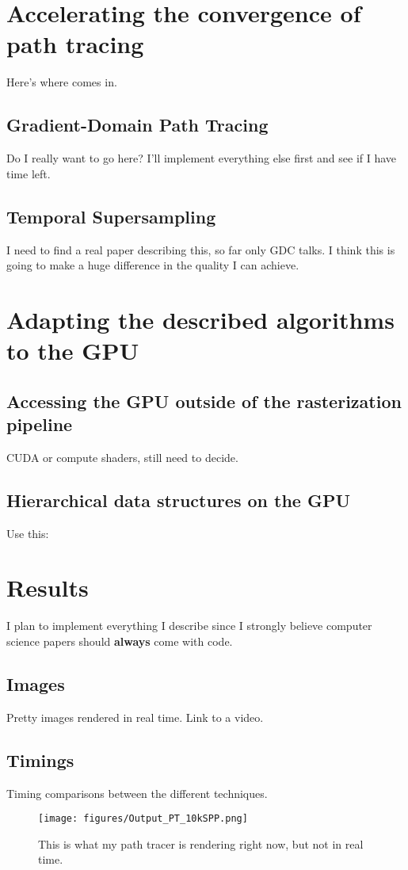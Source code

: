 \documentclass{ACGSeminar}
\begin{document}
\section{Accelerating the convergence of path tracing}
Here's where \cite{Pharr:2010:PBR:1854996} comes in.
\subsection{Gradient-Domain Path Tracing}
Do I really want to go here? \cite{Kettunen2015sg} I'll implement everything else first and see if I have time left.
\subsection{Temporal Supersampling}
I need to find a real paper describing this, so far only GDC talks. I think this is going to make a huge difference in the quality I can achieve.

\section{Adapting the described algorithms to the GPU}
\subsection{Accessing the GPU outside of the rasterization pipeline}
CUDA or compute shaders, still need to decide.
\subsection{Hierarchical data structures on the GPU}
Use this: \cite{Karras:2012:MPC:2383795.2383801}

\section{Results}
I plan to implement everything I describe since I strongly believe computer science papers should \textbf{always} come with code.
\subsection{Images}
Pretty images rendered in real time. Link to a video.
\subsection{Timings}
Timing comparisons between the different techniques.


\begin{figure}[htb!]
  \begin{centering}
    \texttt{[image: figures/Output\_PT\_10kSPP.png]}\par
  \end{centering}
  \caption{This is what my path tracer is rendering right now, but not in real time.}
  \label{fig:pathtraced}
\end{figure}


\printbibliography
\cleardoublepage
\end{document}

